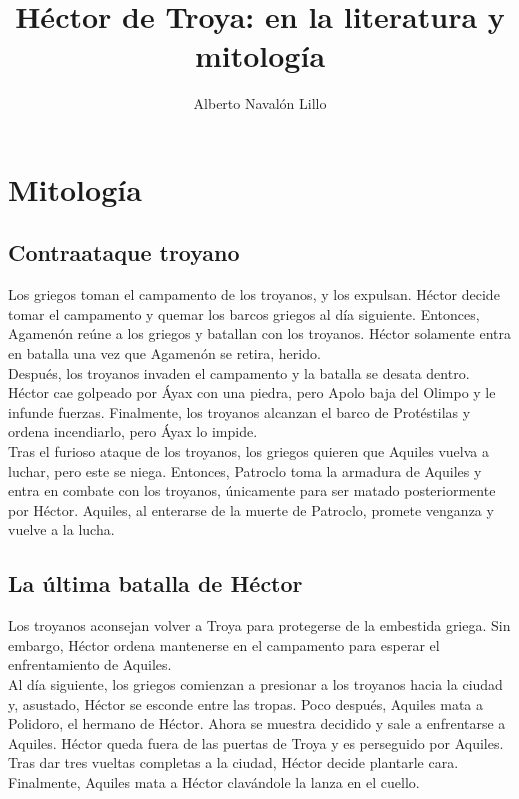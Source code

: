 \documentclass[12pt,a4paper]{article}
\title{\textbf{Héctor de Troya: en la literatura y mitología}}
\author{Alberto Navalón Lillo}
\begin{document}
\maketitle
\tableofcontents

\section{Mitología}

\subsection{Contraataque troyano}
Los griegos toman el campamento de los troyanos, y los expulsan. Héctor decide tomar el campamento y quemar los barcos griegos al día siguiente\footnotemark. Entonces, Agamenón reúne a los griegos y batallan con los troyanos. Héctor solamente entra en batalla una vez que Agamenón se retira, herido.\\

Después, los troyanos invaden el campamento y la batalla se desata dentro. Héctor cae golpeado por Áyax con una piedra, pero Apolo baja del Olimpo y le infunde fuerzas. Finalmente, los troyanos alcanzan el barco de Protéstilas y ordena incendiarlo, pero Áyax lo impide\footnotemark.\\

Tras el furioso ataque de los troyanos, los griegos quieren que Aquiles vuelva a luchar, pero este se niega. Entonces, Patroclo toma la armadura de Aquiles y entra en combate con los troyanos, únicamente para ser matado posteriormente por Héctor\footnotemark. Aquiles, al enterarse de la muerte de Patroclo, promete venganza y vuelve a la lucha.


\subsection{La última batalla de Héctor}
Los troyanos aconsejan volver a Troya para protegerse de la embestida griega. Sin embargo, Héctor ordena mantenerse en el campamento para esperar el enfrentamiento de Aquiles.\\

Al día siguiente, los griegos comienzan a presionar a los troyanos hacia la ciudad y, asustado, Héctor se esconde entre las tropas. Poco después, Aquiles mata a Polidoro, el hermano de Héctor. Ahora se muestra decidido y sale a enfrentarse a Aquiles. Héctor queda fuera de las puertas de Troya y es perseguido por Aquiles. Tras dar tres vueltas completas a la ciudad, Héctor decide plantarle cara\footnotemark. Finalmente, Aquiles mata a Héctor	clavándole la lanza en el cuello.\\
\end{document}
